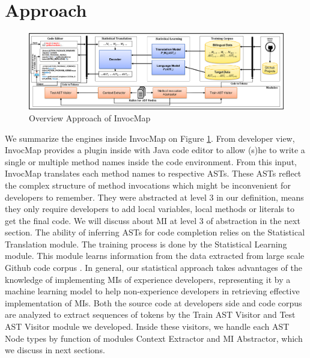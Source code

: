 \section{Approach}
\begin{figure}[]
 \centering
  \includegraphics[width=\linewidth]{ApproachOverview.png}
  \caption{Overview Approach of InvocMap }
  \label{fig:ApproachOverview}
\end{figure}
We summarize the engines inside InvocMap on Figure \ref{fig:ApproachOverview}. From developer view, InvocMap provides a plugin inside with Java code editor to allow (s)he to write a single or multiple method names inside the code environment. From this input, InvocMap translates each method names to respective ASTs. These ASTs reflect the complex structure of method invocations which might be inconvenient for developers to remember. They were abstracted at level 3 in our definition, means they only require developers to add local variables, local methods or literals to get the final code. We will discuss about MI at level 3 of abstraction in the next section. The ability of inferring ASTs for code completion relies on the Statistical Translation module. The training process is done by the Statistical Learning module. This module learns information from the data extracted from large scale Github code corpus  \cite{id:Github}. In general, our statistical approach takes advantages of the knowledge of implementing MIs of experience developers, representing it by a machine learning model to help non-experience developers in retrieving effective implementation of MIs. Both the source code at developers side and code corpus are analyzed to extract sequences of tokens by the Train AST Visitor and Test AST Visitor module we developed. Inside these visitors, we handle each AST Node types by function of modules Context Extractor and MI Abstractor, which we discuss in next sections.
